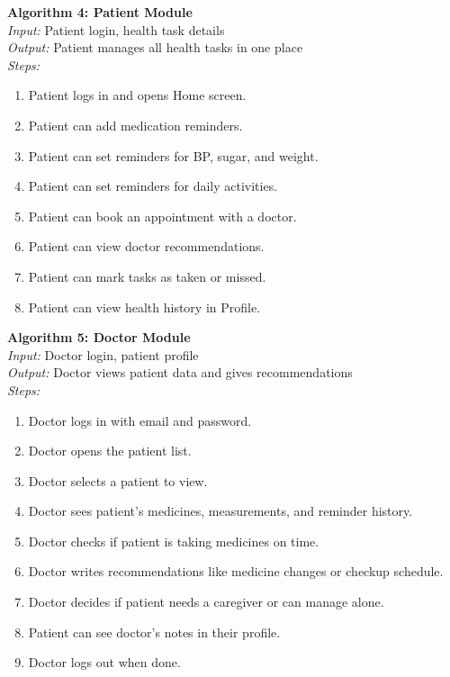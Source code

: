 \textbf{Algorithm 4: Patient Module}\\
\textit{Input:} Patient login, health task details\\
\textit{Output:} Patient manages all health tasks in one place\\
\textit{Steps:}
\begin{enumerate}
    \item Patient logs in and opens Home screen.
    \item Patient can add medication reminders.
    \item Patient can set reminders for BP, sugar, and weight.
    \item Patient can set reminders for daily activities.
    \item Patient can book an appointment with a doctor.
    \item Patient can view doctor recommendations.
    \item Patient can mark tasks as taken or missed.
    \item Patient can view health history in Profile.
\end{enumerate}

\textbf{Algorithm 5: Doctor Module}\\
\textit{Input:} Doctor login, patient profile\\
\textit{Output:} Doctor views patient data and gives recommendations\\
\textit{Steps:}
\begin{enumerate}
    \item Doctor logs in with email and password.
    \item Doctor opens the patient list.
    \item Doctor selects a patient to view.
    \item Doctor sees patient's medicines, measurements, and reminder history.
    \item Doctor checks if patient is taking medicines on time.
    \item Doctor writes recommendations like medicine changes or checkup schedule.
    \item Doctor decides if patient needs a caregiver or can manage alone.
    \item Patient can see doctor's notes in their profile.
    \item Doctor logs out when done.
\end{enumerate}

